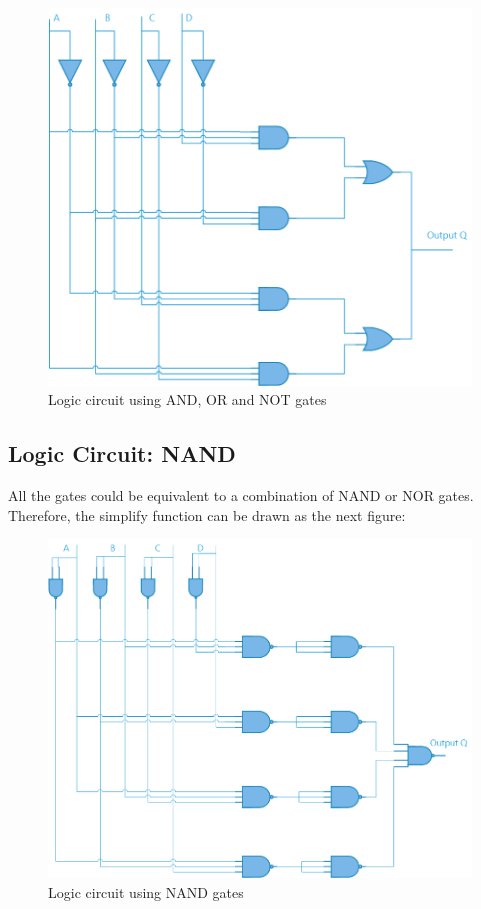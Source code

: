     \begin{figure}[htb!]
        \centering
        \includegraphics[scale=0.45]{../E2TP1/normallogic.png}
        \caption{\color{cyan}Logic circuit using AND, OR and NOT gates}
        \label{fig:normllogic}
    \end{figure}

    \pagebreak

    \subsection{\color{purple}Logic Circuit: NAND}

    All the gates could be equivalent to a combination of NAND or NOR gates. Therefore, the simplify function can be drawn as the next figure:

    \begin{figure}[h!]
        \centering
        \includegraphics[scale=0.45]{../E2TP1/nandlogic.png}
        \caption{\color{cyan}Logic circuit using NAND gates}
        \label{fig:nandlogic}
    \end{figure}
